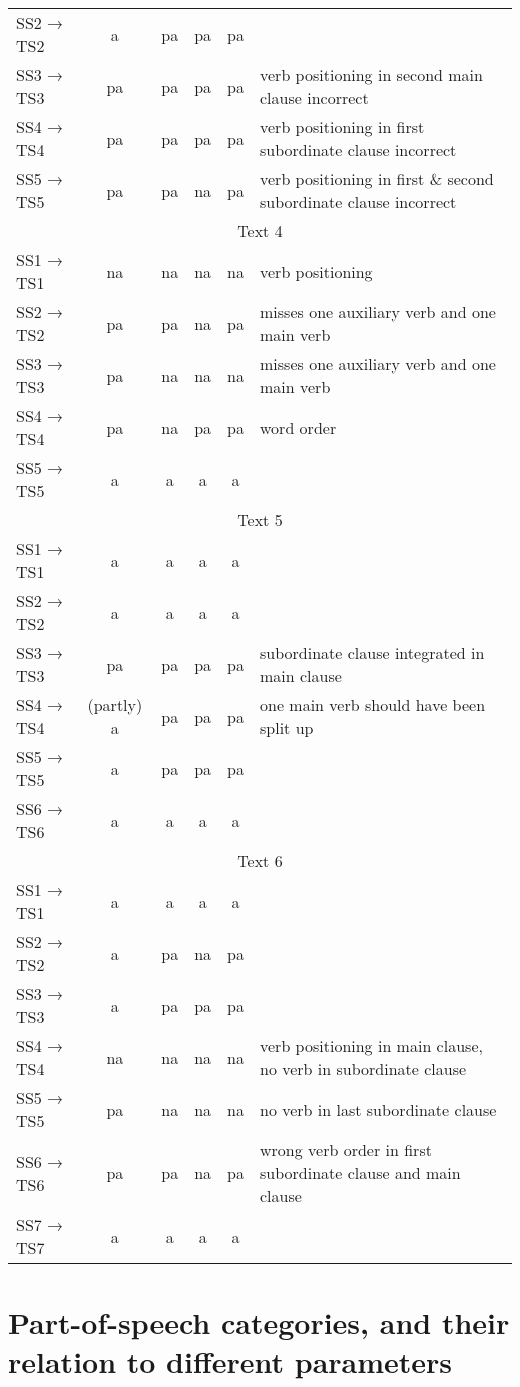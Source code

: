 {\begin{longtable}{l *{4}{c} p{3.75cm}}
 SS2 → TS2 & a & pa & pa & pa & \\
 SS3 → TS3 & pa & pa & pa & pa & verb positioning in second main clause incorrect\\
 SS4 → TS4 & pa & pa & pa & pa & verb positioning in first subordinate clause incorrect\\
 SS5 → TS5 & pa & pa & na & pa & verb positioning in first \& second subordinate clause incorrect\\
\midrule
\multicolumn{6}{c}{Text 4}\\
\midrule
 SS1 → TS1 & na & na & na & na & verb positioning\\
 SS2 → TS2 & pa & pa & na & pa & misses one auxiliary verb and one main verb\\
 SS3 → TS3 & pa & na & na & na & misses one auxiliary verb and one main verb\\
 SS4 → TS4 & pa & na & pa & pa & word order\\
 SS5 → TS5 & a & a & a & a & \\
\midrule
\multicolumn{6}{c}{Text 5}\\
\midrule
 SS1 → TS1 & a & a & a & a & \\
 SS2 → TS2 & a & a & a & a & \\
 SS3 → TS3 & pa & pa & pa & pa & subordinate clause integrated in main clause\\
 SS4 → TS4 & (partly) a & pa & pa & pa & one main verb should have been split up \\
 SS5 → TS5 & a & pa & pa & pa & \\
 SS6 → TS6 & a & a & a & a & \\
\midrule
\multicolumn{6}{c}{Text 6}\\
\midrule
 SS1 → TS1 & a & a & a & a & \\
 SS2 → TS2 & a & pa & na & pa & \\
 SS3 → TS3 & a & pa & pa & pa & \\
 SS4 → TS4 & na & na & na & na & verb positioning in main clause, no verb in subordinate clause\\
 SS5 → TS5 & pa & na & na & na & no verb in last subordinate clause\\
 SS6 → TS6 & pa & pa & na & pa & wrong verb order in first subordinate clause and main clause\\
 SS7 → TS7 & a & a & a & a & \\
\end{longtable}}


\chapter{Part-of-speech categories, and their relation to different parameters}
\label{sec:Appendix:D}

